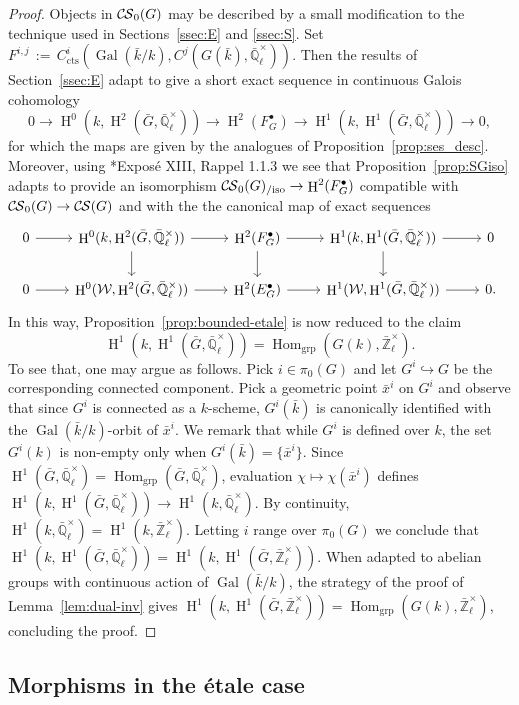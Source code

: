 \documentclass[10pt]{amsart}
\theoremstyle{plain}
\theoremstyle{definition}
\theoremstyle{remark}
\newcommand{\EE}{\mathbb{\bar Q}_\ell}
\newcommand{\bFq}{\bar{k}}
\newcommand{\Fq}{k}
\newcommand{\EEx}{\EE^\times}
\newcommand{\ZEx}{\mathbb{\bar Z}_\ell^\times}
\newcommand{\Weil}[1]{\mathcal{W}_{#1}}
\DeclareMathOperator{\Gal}{Gal}
\DeclareMathOperator{\Hom}{Hom}
\DeclareMathOperator{\Hh}{H}
\newcommand{\ceq}{{\, :=\, }}
\newcommand{\CS}{{\mathcal{C\hskip-0.8pt S}}}
\newcommand{\bCS}{{\CS_0}}
\newcommand{\bCSiso}[1]{\bCS(#1)_{/\text{iso}}}
\newcommand{\bG}{\bar{G}}
\begin{document}
\begin{proof}
Objects in $\bCS(G)$ may be described by a small modification to the technique used in Sections~\ref{ssec:E} and \ref{ssec:S}. 
Set $F^{i,j} \ceq C^i_{\text{cts}} (\Gal(\bFq/\Fq), C^j(G(\bFq), \EEx))$.
Then the results of Section~\ref{ssec:E} adapt to give a short exact sequence in continuous Galois cohomology
 \[
    0 \to
    \Hh^0(\Fq,\Hh^2(\bG,\EEx)) \to
    \Hh^2(F^\bullet_G) \to
    \Hh^1(\Fq,\Hh^1(\bG,\EEx)) \to
    0,
 \]
for which the maps are given by the analogues of Proposition~\ref{prop:ses_desc}.
Moreover, using \cite{deligne-katz:SGA7.2}*{Expos\'e XIII, Rappel 1.1.3} we see that Proposition~\ref{prop:SGiso} adapts to provide an isomorphism $\bCSiso{G}\to \Hh^2(F^\bullet_G)$ compatible with $\bCS(G) \to \CS(G)$ and with the
the canonical map of exact sequences 
 \[
\begin{tikzcd}
    0 \arrow{r} &
    \Hh^0(\Fq,\Hh^2(\bG,\EEx)) \arrow{r} \arrow{d} &
    \Hh^2(F^\bullet_G) \arrow{r} \arrow{d} &
    \Hh^1(\Fq,\Hh^1(\bG,\EEx)) \arrow{r} \arrow{d} &
    0
\\
    0 \arrow{r} & 
    \Hh^0(\Weil{},\Hh^2(\bG,\EEx)) \arrow{r} & 
    \Hh^2(E^\bullet_G) \arrow{r} & 
    \Hh^1(\Weil{},\Hh^1(\bG,\EEx)) \arrow{r} &
    0.
\end{tikzcd}
 \]
In this way, Proposition~\ref{prop:bounded-etale} is now reduced to the claim
\[
\Hh^1(\Fq,\Hh^1(\bG,\EEx)) = \Hom_\text{grp}(G(\Fq),\ZEx).
\]
To see that, one may argue as follows. 
Pick $i\in \pi_0(G)$ and let $G^i \hookrightarrow G$ be the corresponding connected component. 
Pick a geometric point ${\bar x}^i$ on $G^i$ and observe that since $G^i$ is connected as a $\Fq$-scheme, $G^i(\bFq)$ is canonically identified with the $\Gal(\bFq/\Fq)$-orbit of ${\bar x}^i$. 
We remark that while $G^i$ is defined over $\Fq$, the set $G^i(\Fq)$ is non-empty only when $G^i(\bFq) = \{ {\bar x}^i\}$.
Since $\Hh^1(\bG,\EEx) = \Hom_\text{grp}(\bG,\EEx)$, evaluation $\chi \mapsto \chi({\bar x}^i)$ defines $\Hh^1(\Fq,\Hh^1(\bG,\EEx)) \to \Hh^1(\Fq,\EEx)$. 
By continuity, $\Hh^1(\Fq,\EEx) = \Hh^1(\Fq,\ZEx)$.
Letting $i$ range over $\pi_0(G)$ we conclude that $\Hh^1(\Fq,\Hh^1(\bG,\EEx)) = \Hh^1(\Fq,\Hh^1(\bG,\ZEx))$.
When adapted to abelian groups with continuous action of $\Gal(\bFq/\Fq)$, the strategy of the proof of Lemma~\ref{lem:dual-inv} gives $\Hh^1(\Fq,\Hh^1(\bG,\ZEx)) =  \Hom_\text{grp}(G(\Fq),\ZEx)$, concluding the proof.
\end{proof}

\subsection{Morphisms in the \'etale case}\label{ssec:mor-etale}
\end{document}
